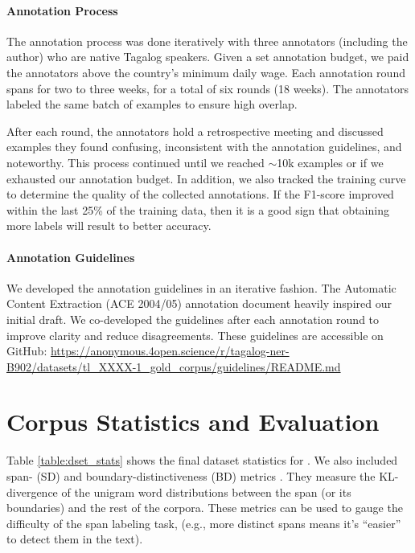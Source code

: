 \documentclass[11pt]{article}
\begin{document}
\paragraph{Annotation Process}
The annotation process was done iteratively with three annotators (including the author) who are native Tagalog speakers.
Given a set annotation budget, we paid the annotators above the country's minimum daily wage.
Each annotation round spans for two to three weeks, for a total of six rounds (18 weeks).
The annotators labeled the same batch of examples to ensure high overlap.

After each round, the annotators hold a retrospective meeting and discussed examples they found confusing, inconsistent with the annotation guidelines, and noteworthy.
This process continued until we reached $\sim$10k examples or if we exhausted our annotation budget.
In addition, we also tracked the training curve to determine the quality of the collected annotations.
If the F1-score improved within the last 25\% of the training data, then it is a good sign that obtaining more labels will result to better accuracy.

\paragraph{Annotation Guidelines}
We developed the annotation guidelines in an iterative fashion. 
The Automatic Content Extraction (ACE 2004/05) annotation document \cite{Doddington2004TheAC} heavily inspired our initial draft.
We co-developed the guidelines after each annotation round to improve clarity and reduce disagreements.
These guidelines are accessible on GitHub: \url{https://anonymous.4open.science/r/tagalog-ner-B902/datasets/tl_XXXX-1_gold_corpus/guidelines/README.md}

\section{Corpus Statistics and Evaluation}

Table \ref{table:dset_stats} shows the final dataset statistics for \tlunified{}.
We also included span- (SD) and boundary-distinctiveness (BD) metrics \cite{Papay2020DissectingSI}.
They measure the KL-divergence of the unigram word distributions between the span (or its boundaries) and the rest of the corpora.
These metrics can be used to gauge the difficulty of the span labeling task, (e.g., more distinct spans means it's ``easier'' to detect them in the text). 
\end{document}
